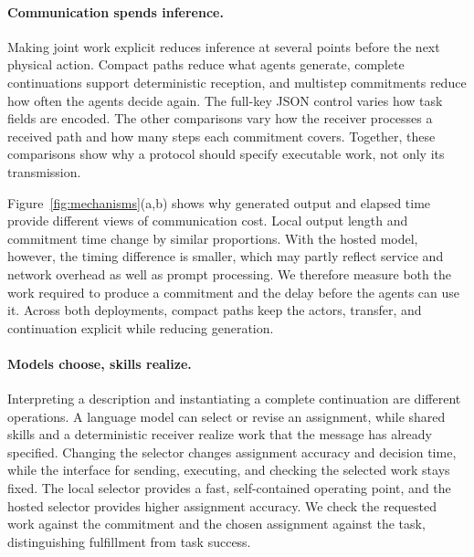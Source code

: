 \documentclass[sigconf,nonacm,balance=false]{aamas}
\begin{document}
\paragraph{Communication spends inference.}
Making joint work explicit reduces inference at several points before the next physical action. Compact paths reduce what agents generate, complete continuations support deterministic reception, and multistep commitments reduce how often the agents decide again. The full-key JSON control varies how task fields are encoded. The other comparisons vary how the receiver processes a received path and how many steps each commitment covers. Together, these comparisons show why a protocol should specify executable work, not only its transmission.

Figure~\ref{fig:mechanisms}(a,b) shows why generated output and elapsed time provide different views of communication cost. Local output length and commitment time change by similar proportions. With the hosted model, however, the timing difference is smaller, which may partly reflect service and network overhead as well as prompt processing. We therefore measure both the work required to produce a commitment and the delay before the agents can use it. Across both deployments, compact paths keep the actors, transfer, and continuation explicit while reducing generation.

\paragraph{Models choose, skills realize.}
Interpreting a description and instantiating a complete continuation are different operations. A language model can select or revise an assignment, while shared skills and a deterministic receiver realize work that the message has already specified. Changing the selector changes assignment accuracy and decision time, while the interface for sending, executing, and checking the selected work stays fixed. The local selector provides a fast, self-contained operating point, and the hosted selector provides higher assignment accuracy. We check the requested work against the commitment and the chosen assignment against the task, distinguishing fulfillment from task success. 
\end{document}
